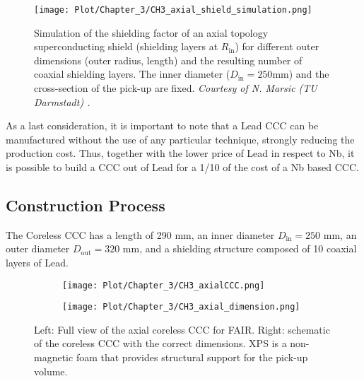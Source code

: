 \documentclass[12pt,a4paper]{report}
\begin{document}
       \begin{figure}[H]
       	\centering
       	\texttt{[image: Plot/Chapter\_3/CH3\_axial\_shield\_simulation.png]}
       	\caption{\small{Simulation of the shielding factor of an axial topology superconducting shield (shielding layers at \(R_{\text{in}}\)) for different outer dimensions (outer radius, length) and the resulting number of coaxial shielding layers. The inner diameter (\(D_{\text{in}} = 250 \text{mm}\)) and the cross-section of the pick-up are fixed. \textit{Courtesy of N. Marsic (TU Darmstadt) \cite{Marsic_BMBF}.}}}
       	\label{CH3_Axial_shield_simulation}
       \end{figure}
       
       As a last consideration, it is important to note that a Lead CCC can be manufactured without the use of any particular technique, strongly reducing the production cost. Thus, together with the lower price of Lead in respect to Nb, it is possible to build a CCC out of Lead for a 1/10 of the cost of a Nb based CCC.
       
       \subsection{Construction Process}
       
       The Coreless CCC has a length of 290 mm, an inner diameter \(D_{\text{in}} = 250\) mm, an outer diameter \(D_{\text{out}} = 320\) mm, and a shielding structure composed of 10 coaxial layers of Lead. 
       
       \begin{figure}[H]
       	\begin{subfigure}[b]{0.4\textwidth}
       		\centering
       		\texttt{[image: Plot/Chapter\_3/CH3\_axialCCC.png]}
       	\end{subfigure}
       	\hfill
       	\begin{subfigure}[b]{0.55\textwidth}
       		\centering
       		\texttt{[image: Plot/Chapter\_3/CH3\_axial\_dimension.png]}
       	\end{subfigure}
       	\caption{\small{ Left: Full view of the axial coreless CCC for FAIR. Right: schematic of the coreless CCC with the correct dimensions. XPS is a non-magnetic foam that provides structural support for the pick-up volume.}}
       	\label{CH3_axial_CCC_halfview}
       \end{figure}
       
\end{document}

